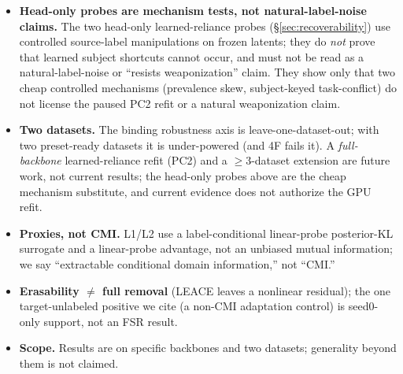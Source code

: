 \begin{itemize}
to test the machinery; they do not speak to natural or learned reliance, and must not be conflated with
the natural refusal (\S\ref{sec:rq4}).
\item \textbf{Head-only probes are mechanism tests, not natural-label-noise claims.} The two head-only
learned-reliance probes (\S\ref{sec:recoverability}) use controlled source-label manipulations on frozen
latents; they do \emph{not} prove that learned subject shortcuts cannot occur, and must not be read as a
natural-label-noise or ``resists weaponization'' claim. They show only that two cheap controlled
mechanisms (prevalence skew, subject-keyed task-conflict) do not license the paused PC2 refit or a
natural weaponization claim.
\item \textbf{Two datasets.} The binding robustness axis is leave-one-dataset-out; with two preset-ready
datasets it is under-powered (and 4F fails it). A \emph{full-backbone} learned-reliance refit (PC2) and a
$\geq 3$-dataset extension are future work, not current results; the head-only probes above are the cheap
mechanism substitute, and current evidence does not authorize the GPU refit.
\item \textbf{Proxies, not CMI.} L1/L2 use a label-conditional linear-probe posterior-KL surrogate and
a linear-probe advantage, not an unbiased mutual information; we say ``extractable conditional domain
information,'' not ``CMI.''
\item \textbf{Erasability $\neq$ full removal} (LEACE leaves a nonlinear residual); the one
target-unlabeled positive we cite (a non-CMI adaptation control) is seed0-only support, not an FSR
result.
\item \textbf{Scope.} Results are on specific backbones and two datasets; generality beyond them is not
claimed.
\end{itemize}
